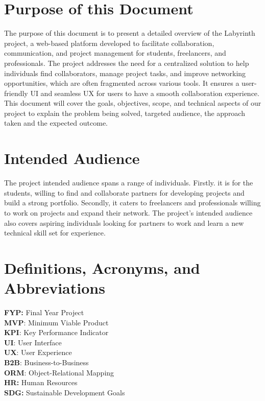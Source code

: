 \documentclass{FastFyp}
\begin{document}
\section{Purpose of this Document}
The purpose of this document is to present a detailed overview of the Labyrinth project, a web-based platform developed to facilitate collaboration, communication, and project management for students, freelancers, and professionals. The project addresses the need for a centralized solution to help individuals find collaborators, manage project tasks, and improve networking opportunities, which are often fragmented across various tools. It ensures a user-friendly UI and seamless UX for users to have a smooth collaboration experience. This document will cover the goals, objectives, scope, and technical aspects of our project to explain the problem being solved, targeted audience, the approach taken and the expected outcome. 
\section{Intended Audience}
The project intended audience spans a range of individuals. Firstly. it is for the students, willing to find and collaborate partners for developing projects and build a strong portfolio. Secondly, it caters to freelancers and professionals willing to work on projects and expand their network. The project's intended audience also covers aspiring individuals looking for partners to work and learn a new technical skill set for experience.
\section{Definitions, Acronyms, and Abbreviations}

\textbf{FYP:} Final Year Project\\
\textbf{MVP}: Minimum Viable Product\\
\textbf{KPI}: Key Performance Indicator\\
\textbf{UI}: User Interface\\
\textbf{UX}: User Experience\\
\textbf{B2B}: Business-to-Business\\
\textbf{ORM}: Object-Relational Mapping\\
\textbf{HR:} Human Resources \\
\textbf{SDG: } Sustainable Development Goals \\
\end{document}

